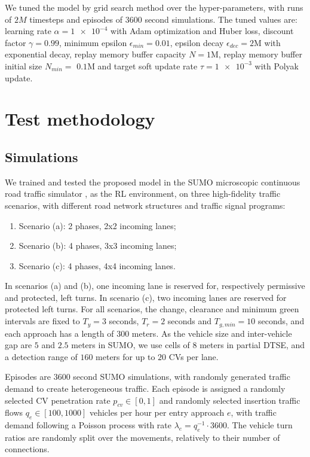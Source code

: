 \documentclass[journal]{IEEEtran}
\begin{document}
We tuned the model by grid search method over the hyper-parameters, with runs of $2M$ timesteps and episodes of 3600 second simulations. The tuned values are: learning rate $\alpha=\num{1e-4}$ with Adam optimization and Huber loss, discount factor $\gamma=0.99$, minimum epsilon $\epsilon_{min}=0.01$, epsilon decay $\epsilon_{dec}=2$M with exponential decay, replay memory buffer capacity $N=1$M, replay memory buffer initial size $N_{min}=$ $0.1$M and target soft update rate $\tau=\num{1e-3}$ with Polyak update.

\section{Test methodology}
\label{sec:methodology}

\subsection{Simulations}

We trained and tested the proposed model in the SUMO microscopic continuous road traffic simulator \cite{krajzewicz2012recent,kheterpal2018flow}, as the RL environment, on three high-fidelity traffic scenarios, with different road network structures and traffic signal programs:
\begin{enumerate}
  \item Scenario (a): 2 phases, 2x2 incoming lanes;
  \item Scenario (b): 4 phases, 3x3 incoming lanes;
  \item Scenario (c): 4 phases, 4x4 incoming lanes.
\end{enumerate}

In scenarios (a) and (b), one incoming lane is reserved for, respectively permissive and protected, left turns. In scenario (c), two incoming lanes are reserved for protected left turns. For all scenarios, the change, clearance and minimum green intervals are fixed to $T_y = 3$ seconds, $T_r = 2$ seconds and $T_{g,min} = 10$ seconds, and each approach has a length of $300$ meters. As the vehicle size and inter-vehicle gap are $5$ and $2.5$ meters in SUMO, we use cells of $8$ meters in partial DTSE, and a detection range of $160$ meters for up to $20$ CVs per lane. 

Episodes are 3600 second SUMO simulations, with randomly generated traffic demand to create heterogeneous traffic. Each episode is assigned a randomly selected CV penetration rate $p_{cv} \in [0,1]$ and randomly selected insertion traffic flows $q_e \in [100,1000]$ vehicles per hour per entry approach $e$, with traffic demand following a Poisson process with rate $\lambda_e = q_e^{-1}\cdot 3600$. The vehicle turn ratios are randomly split over the movements, relatively to their number of connections. 
\end{document}
